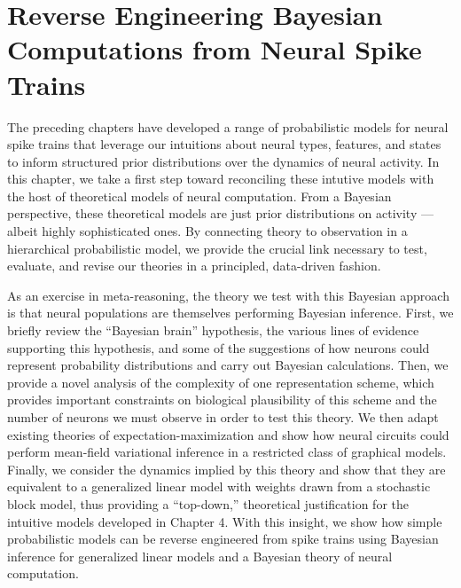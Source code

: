 \chapter{Reverse Engineering Bayesian Computations from Neural Spike Trains}

The preceding chapters have developed a range of probabilistic models
for neural spike trains that leverage our intuitions about neural
types, features, and states to inform structured prior distributions over
the dynamics of neural activity. In this chapter, we take a
first step toward reconciling these intutive models with the host of
theoretical models of neural computation. From a Bayesian perspective,
these theoretical models are just prior distributions on activity ---
albeit highly sophisticated ones. By connecting theory to observation
in a hierarchical probabilistic model, we provide the crucial link
necessary to test, evaluate, and revise our theories in a principled,
data-driven fashion.

As an exercise in meta-reasoning, the theory we test with this Bayesian
approach is that neural populations are themselves performing Bayesian
inference.
First, we briefly review the ``Bayesian brain'' hypothesis, the
various lines of evidence supporting this hypothesis, and some of
the suggestions of how neurons could represent probability distributions
and carry out Bayesian calculations. 
Then, we provide a novel analysis of the complexity of one
representation scheme, which provides important constraints on 
biological plausibility of this scheme and the number of neurons we
must observe in order to test this theory.
We then adapt existing theories of expectation-maximization and show how 
neural circuits could perform mean-field variational inference in
a restricted class of graphical models.
Finally, we consider the dynamics implied by this theory and show that
they are equivalent to a generalized linear model with weights drawn
from a stochastic block model, thus providing a ``top-down,'' theoretical
justification for the intuitive models developed in Chapter 4.
With this insight, we show how simple probabilistic models can
be reverse engineered from spike trains using Bayesian inference for
generalized linear models and a Bayesian theory of neural computation. 

